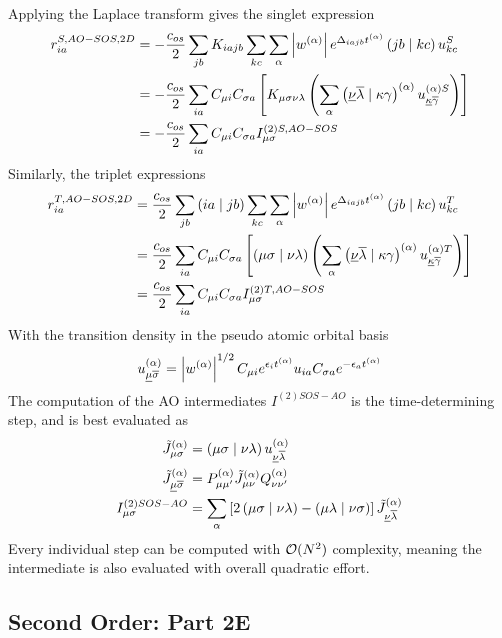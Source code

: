 \noindent Applying the Laplace transform gives the singlet expression
\begin{align}
\begin{split}
r_{ia}^{S,AO-SOS,2D} &= -\frac{c_{os}}{2} \sum_{jb} K_{iajb} \sum_{kc} \sum_{\alpha} \left\lvert w^{(\alpha)} \right\rvert e^{\Delta_{iajb}t^{(\alpha)}} \left( jb \mid kc \right) u_{kc}^S \\
&= -\frac{c_{os}}{2} \sum_{ia} C_{\mu i} C_{\sigma a} \left[  K_{\mu\sigma\nu\lambda} \left( \sum_{\alpha} \left( \underline{\nu}\overline{\lambda} \mid \kappa\gamma \right)^{(\alpha)} u^{(\alpha)S}_{\underline{\kappa}\overline{\gamma}} \right)  \right] \\
&= -\frac{c_{os}}{2} \sum_{ia} C_{\mu i} C_{\sigma a} I^{(2)S,AO-SOS}_{\mu\sigma} 
\end{split} 
\end{align}
Similarly, the triplet expressions
\begin{align}
\begin{split}
r_{ia}^{T,AO-SOS,2D} &= \frac{c_{os}}{2} \sum_{jb} \left( ia \mid jb \right) \sum_{kc} \sum_{\alpha} \left\lvert w^{(\alpha)} \right\rvert e^{\Delta_{iajb}t^{(\alpha)}} \left( jb \mid kc \right) u_{kc}^T \\
&= \frac{c_{os}}{2} \sum_{ia} C_{\mu i} C_{\sigma a} \left[  \left( \mu\sigma \mid \nu\lambda \right) \left( \sum_{\alpha} \left( \underline{\nu}\overline{\lambda} \mid \kappa\gamma \right)^{(\alpha)} u^{(\alpha)T}_{\underline{\kappa}\overline{\gamma}} \right) \right] \\
&= \frac{c_{os}}{2} \sum_{ia} C_{\mu i} C_{\sigma a} I^{(2)T,AO-SOS}_{\mu\sigma} 
\end{split}
\end{align}
\noindent With the transition density in the pseudo atomic orbital basis
\begin{equation}
u^{(\alpha)}_{\underline{\mu}\overline{\sigma}} = \left\lvert w^{(\alpha)} \right\rvert^{1/2} C_{\mu i} e^{\epsilon_i t^{(\alpha)}}  u_{ia} C_{\sigma a} e^{-\epsilon_a t^{(\alpha)}} 
\end{equation}
\noindent The computation of the AO intermediates $I^{(2)SOS-AO}$ is the time-determining step, and is best evaluated as
\begin{align}
\tilde{J}^{(\alpha)}_{\mu\sigma} &= \left( \mu\sigma \mid \nu\lambda \right) u^{(\alpha)}_{\underline{\nu}\overline{\lambda}} \\
\tilde{J}_{\underline{\mu}\overline{\sigma}}^{(\alpha)} &= P_{\mu\mu'}^{(\alpha)} \tilde{J}^{(\alpha)}_{\mu\nu} Q_{\nu\nu'}^{(\alpha)} \\
I^{(2)SOS-AO}_{\mu\sigma} &= \sum_{\alpha} \left[2 \left( \mu\sigma \mid \nu\lambda \right) - \left( \mu\lambda \mid \nu\sigma \right) \right] \tilde{J}_{\underline{\nu}\overline{\lambda}}^{(\alpha)}
\end{align}
\noindent Every individual step can be computed with $\mathcal{O}(N^{2})$ complexity, meaning the intermediate is also evaluated with overall quadratic effort.

\subsection{Second Order: Part 2E}

